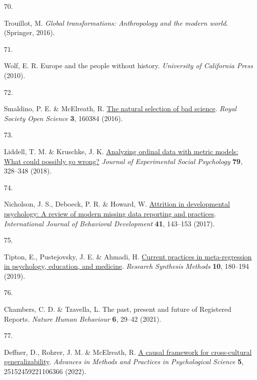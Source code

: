 \documentclass[
  man,floatsintext]{apa6}
\newlength{\cslhangindent}
\newlength{\csllabelwidth}
\newlength{\cslentryspacingunit} %
\newenvironment{CSLReferences}[2] %
 {%
  \setlength{\parindent}{0pt}
  \ifodd #1
  \let\oldpar\par
  \def\par{\hangindent=\cslhangindent\oldpar}
  \fi
  \setlength{\parskip}{#2\cslentryspacingunit}
 }%
 {}
\newcommand{\CSLLeftMargin}[1]{\parbox[t]{\csllabelwidth}{#1}}
\newcommand{\CSLRightInline}[1]{\parbox[t]{\linewidth - \csllabelwidth}{#1}\break}
\begin{document}
\begin{CSLReferences}{0}{0}
\leavevmode{}%
\CSLLeftMargin{70. }%
\CSLRightInline{Trouillot, M. \emph{Global transformations: Anthropology and the modern world}. (Springer, 2016).}

\leavevmode{}%
\CSLLeftMargin{71. }%
\CSLRightInline{Wolf, E. R. Europe and the people without history. \emph{University of California Press} (2010).}

\leavevmode{}%
\CSLLeftMargin{72. }%
\CSLRightInline{Smaldino, P. E. \& McElreath, R. \href{https://doi.org/10.1098/rsos.160384}{The natural selection of bad science}. \emph{Royal Society Open Science} \textbf{3}, 160384 (2016).}

\leavevmode{}%
\CSLLeftMargin{73. }%
\CSLRightInline{Liddell, T. M. \& Kruschke, J. K. \href{https://doi.org/10.1016/j.jesp.2018.08.009}{Analyzing ordinal data with metric models: What could possibly go wrong?} \emph{Journal of Experimental Social Psychology} \textbf{79}, 328--348 (2018).}

\leavevmode{}%
\CSLLeftMargin{74. }%
\CSLRightInline{Nicholson, J. S., Deboeck, P. R. \& Howard, W. \href{https://doi.org/10.1177/0165025415618275}{Attrition in developmental psychology: A review of modern missing data reporting and practices}. \emph{International Journal of Behavioral Development} \textbf{41}, 143--153 (2017).}

\leavevmode{}%
\CSLLeftMargin{75. }%
\CSLRightInline{Tipton, E., Pustejovsky, J. E. \& Ahmadi, H. \href{https://doi.org/10.1002/jrsm.1339}{Current practices in meta-regression in psychology, education, and medicine}. \emph{Research Synthesis Methods} \textbf{10}, 180--194 (2019).}

\leavevmode{}%
\CSLLeftMargin{76. }%
\CSLRightInline{Chambers, C. D. \& Tzavella, L. The past, present and future of {Registered Reports}. \emph{Nature Human Behaviour} \textbf{6}, 29--42 (2021).}

\leavevmode{}%
\CSLLeftMargin{77. }%
\CSLRightInline{Deffner, D., Rohrer, J. M. \& McElreath, R. \href{https://doi.org/10.1177/25152459221106366}{A causal framework for cross-cultural generalizability}. \emph{Advances in Methods and Practices in Psychological Science} \textbf{5}, 25152459221106366 (2022).}


\end{CSLReferences}
\end{document}
